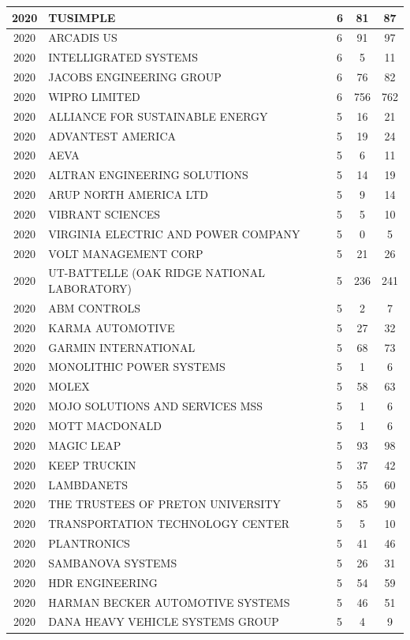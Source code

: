 \documentclass{article}%
\begin{document}
\begin{longtable}{c|p{20em}|p{5em}|c|c}
\hline%
2020&TUSIMPLE&6&81&87\\%
\hline%
2020&ARCADIS US&6&91&97\\%
\hline%
2020&INTELLIGRATED SYSTEMS&6&5&11\\%
\hline%
2020&JACOBS ENGINEERING GROUP&6&76&82\\%
\hline%
2020&WIPRO LIMITED&6&756&762\\%
\hline%
2020&ALLIANCE FOR SUSTAINABLE ENERGY&5&16&21\\%
\hline%
2020&ADVANTEST AMERICA&5&19&24\\%
\hline%
2020&AEVA&5&6&11\\%
\hline%
2020&ALTRAN ENGINEERING SOLUTIONS&5&14&19\\%
\hline%
2020&ARUP NORTH AMERICA LTD&5&9&14\\%
\hline%
2020&VIBRANT SCIENCES&5&5&10\\%
\hline%
2020&VIRGINIA ELECTRIC AND POWER COMPANY&5&0&5\\%
\hline%
2020&VOLT MANAGEMENT CORP&5&21&26\\%
\hline%
2020&UT{-}BATTELLE  (OAK RIDGE NATIONAL LABORATORY)&5&236&241\\%
\hline%
2020&ABM CONTROLS&5&2&7\\%
\hline%
2020&KARMA AUTOMOTIVE&5&27&32\\%
\hline%
2020&GARMIN INTERNATIONAL&5&68&73\\%
\hline%
2020&MONOLITHIC POWER SYSTEMS&5&1&6\\%
\hline%
2020&MOLEX&5&58&63\\%
\hline%
2020&MOJO SOLUTIONS AND SERVICES MSS&5&1&6\\%
\hline%
2020&MOTT MACDONALD&5&1&6\\%
\hline%
2020&MAGIC LEAP&5&93&98\\%
\hline%
2020&KEEP TRUCKIN&5&37&42\\%
\hline%
2020&LAMBDANETS&5&55&60\\%
\hline%
2020&THE TRUSTEES OF PRETON UNIVERSITY&5&85&90\\%
\hline%
2020&TRANSPORTATION TECHNOLOGY CENTER&5&5&10\\%
\hline%
2020&PLANTRONICS&5&41&46\\%
\hline%
2020&SAMBANOVA SYSTEMS&5&26&31\\%
\hline%
2020&HDR ENGINEERING&5&54&59\\%
\hline%
2020&HARMAN BECKER AUTOMOTIVE SYSTEMS&5&46&51\\%
\hline%
2020&DANA HEAVY VEHICLE SYSTEMS GROUP&5&4&9\\%

\end{longtable}
\end{document}
